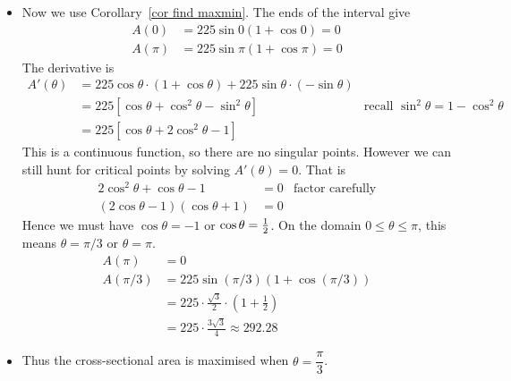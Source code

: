 \begin{eg}
\begin{itemize}
\item Now we use Corollary~\ref{cor find maxmin}. The ends of the interval give
\begin{align*}
  A(0) &= 225 \sin 0 (1 + \cos 0) = 0 \\
  A(\pi) &= 225 \sin \pi ( 1+ \cos \pi) = 0
\end{align*}
The derivative is
\begin{align*}
  A'(\theta) &= 225 \cos\theta \cdot (1+\cos\theta) + 225 \sin\theta \cdot(-\sin\theta) \\
  &= 225 \left[ \cos \theta + \cos^2\theta - \sin^2\theta \right]
&\text {recall $\sin^2\theta = 1 - \cos^2\theta$}\\
  &= 225 \left[ \cos\theta +2\cos^2\theta -1 \right]
\end{align*}
This is a continuous function, so there are no singular points. However we can still hunt
for critical points by solving $A'(\theta) = 0$. That is
\begin{align*}
  2\cos^2\theta + \cos \theta -1 &= 0 & \text{factor carefully}\\
  (2\cos\theta -1)(\cos \theta+1) &= 0
\end{align*}
Hence we must have $\cos \theta =-1$ or $\cos\theta = \tfrac{1}{2}$. On the domain $0\leq \theta
\leq \pi$, this means $\theta = \pi/3$ or $\theta = \pi$.
\begin{align*}
  A(\pi) &= 0 \\
  A(\pi/3) &= 225 \sin(\pi/3) (1 + \cos(\pi/3)) \\
  & = 225 \cdot \frac{\sqrt{3}}{2} \cdot \left( 1 + \frac{1}{2} \right) \\
  &= 225 \cdot \frac{3\sqrt{3}}{4} \approx 292.28
\end{align*}
\item Thus the cross-sectional area is maximised when $\theta = \dfrac{\pi}{3}$.
\end{itemize}
\end{eg}


